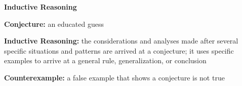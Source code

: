 \begin{center}
\textbf{Inductive Reasoning}
\end{center}

\vspace*{1ex}

\textbf{Conjecture:} an educated guess

\vspce 

\textbf{Inductive Reasoning:} the considerations and analyses made after several specific situations and patterns are arrived at a conjecture; it uses specific examples to arrive at a general rule, generalization, or conclusion 

\vspce 

\textbf{Counterexample:} a false example that shows a conjecture is not true



